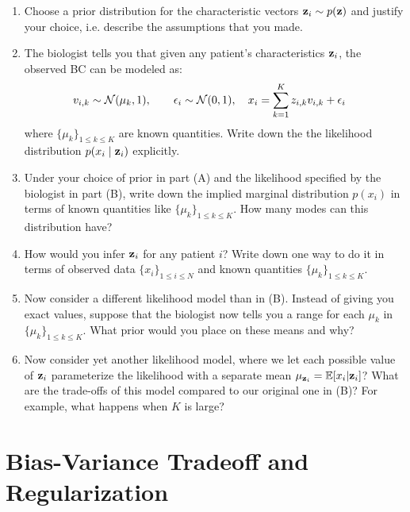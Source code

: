 \documentclass[11pt]{article}
\begin{document}
\begin{enumerate}[label=(\Alph*)]

    \item  Choose a prior distribution for the characteristic vectors ${\mathbf z}_i \sim p({\mathbf z})$ and justify your choice, i.e. describe the assumptions that you made.
    
    
    \item The biologist tells you that given any patient's characteristics ${\mathbf z}_i$, the observed BC can be modeled as:
        \begin{align*}
            v_{i, k} &\sim \mathcal{N}(\mu_k, 1), \qquad \epsilon_i\sim \mathcal{N}(0,1), \quad 
            x_i =  \sum_{k=1}^K z_{i, k} v_{i,k} + \epsilon_i
        \end{align*}
    where $\{\mu_k\}_{1 \leq k \leq K}$ are known quantities. Write down the the likelihood distribution $p(x_i \mid {\mathbf z}_i)$ explicitly.
    
    
    \item Under your choice of prior in part (A) and the likelihood specified by the biologist in part (B), write down the implied marginal distribution $p(x_i)$ in terms of known quantities like $\{\mu_k\}_{1 \leq k \leq K}$. How many modes can this distribution have?
    
    
    \item How would you infer ${\mathbf z}_i$ for any patient $i$? Write down one way to do it in terms of observed data $\{x_i\}_{1 \leq i\leq N}$ and known quantities $\{\mu_k\}_{1 \leq k\leq K}$.
    
    
    \item Now consider a different likelihood model than in (B). Instead of giving you exact values, suppose that the biologist now tells you a range for each $\mu_k$ in $\{\mu_k\}_{1 \leq k\leq K}$. What prior would you place on these means and why?
    
    
    \item Now consider yet another likelihood model, where we let each possible value of ${\mathbf z}_i$ parameterize the likelihood with a separate mean $\mu_{{\mathbf z}_i}=\mathbb{E}[x_i|{\mathbf z}_i]$? What are the trade-offs of this model compared to our original one in (B)? For example, what happens when $K$ is large?

\end{enumerate} 

\newpage

\section{Bias-Variance Tradeoff and Regularization} 
\end{document}
